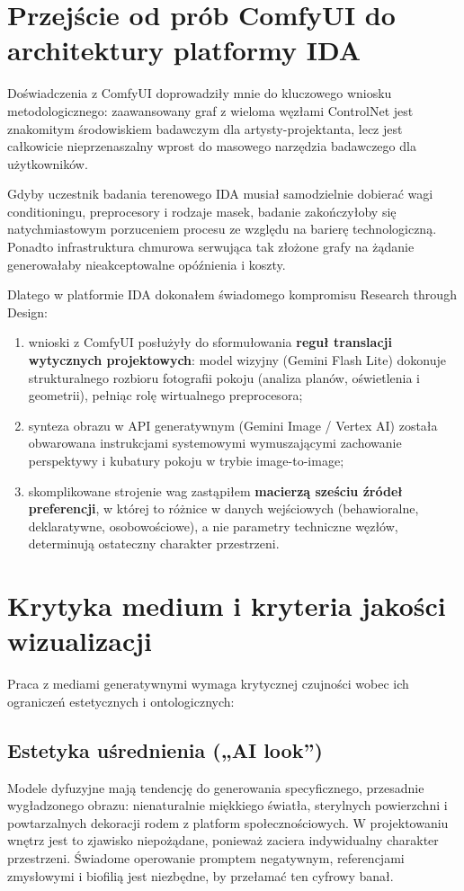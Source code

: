 \section{Przejście od prób ComfyUI do architektury platformy IDA}
\label{ch04:sec:most-ida}

Doświadczenia z ComfyUI doprowadziły mnie do kluczowego wniosku metodologicznego: zaawansowany graf z wieloma węzłami ControlNet jest znakomitym środowiskiem badawczym dla artysty-projektanta, lecz jest całkowicie nieprzenaszalny wprost do masowego narzędzia badawczego dla użytkowników.

Gdyby uczestnik badania terenowego IDA musiał samodzielnie dobierać wagi conditioningu, preprocesory i rodzaje masek, badanie zakończyłoby się natychmiastowym porzuceniem procesu ze względu na barierę technologiczną. Ponadto infrastruktura chmurowa serwująca tak złożone grafy na żądanie generowałaby nieakceptowalne opóźnienia i koszty.

Dlatego w platformie IDA dokonałem świadomego kompromisu Research through Design:
\begin{enumerate}
  \item wnioski z ComfyUI posłużyły do sformułowania \textbf{reguł translacji wytycznych projektowych}: model wizyjny (Gemini Flash Lite) dokonuje strukturalnego rozbioru fotografii pokoju (analiza planów, oświetlenia i geometrii), pełniąc rolę wirtualnego preprocesora;
  \item synteza obrazu w API generatywnym (Gemini Image / Vertex AI) została obwarowana instrukcjami systemowymi wymuszającymi zachowanie perspektywy i kubatury pokoju w trybie image-to-image;
  \item skomplikowane strojenie wag zastąpiłem \textbf{macierzą sześciu źródeł preferencji}, w której to różnice w danych wejściowych (behawioralne, deklaratywne, osobowościowe), a nie parametry techniczne węzłów, determinują ostateczny charakter przestrzeni.
\end{enumerate}

\section{Krytyka medium i kryteria jakości wizualizacji}
\label{ch04:sec:krytyka}

Praca z mediami generatywnymi wymaga krytycznej czujności wobec ich ograniczeń estetycznych i ontologicznych:

\subsection{Estetyka uśrednienia („AI look”)}
Modele dyfuzyjne mają tendencję do generowania specyficznego, przesadnie wygładzonego obrazu: nienaturalnie miękkiego światła, sterylnych powierzchni i powtarzalnych dekoracji rodem z platform społecznościowych. W projektowaniu wnętrz jest to zjawisko niepożądane, ponieważ zaciera indywidualny charakter przestrzeni. Świadome operowanie promptem negatywnym, referencjami zmysłowymi i biofilią jest niezbędne, by przełamać ten cyfrowy banał.

